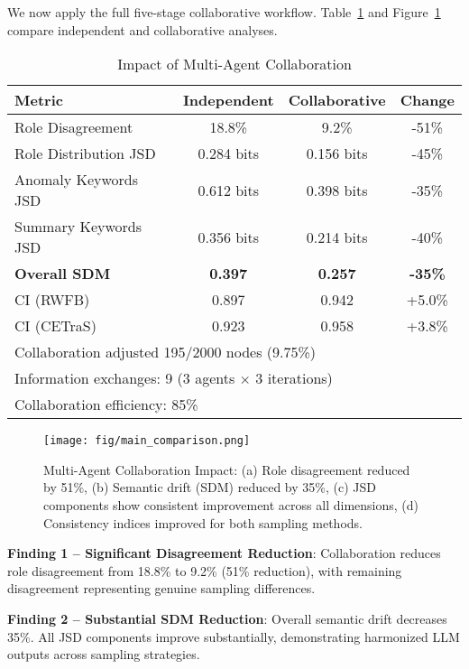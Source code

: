 \documentclass[conference]{IEEEtran}
\begin{document}
We now apply the full five-stage collaborative workflow. Table~\ref{tab:collaboration-impact} and Figure~\ref{fig:main-comparison} compare independent and collaborative analyses.

\begin{table}[htbp]
\centering
\caption{Impact of Multi-Agent Collaboration}
\label{tab:collaboration-impact}
\small
\begin{tabular}{l c c c}
\toprule
\textbf{Metric} & \textbf{Independent} & \textbf{Collaborative} & \textbf{Change} \\
\midrule
Role Disagreement & 18.8\% & 9.2\% & -51\% \\
Role Distribution JSD & 0.284 bits & 0.156 bits & -45\% \\
Anomaly Keywords JSD & 0.612 bits & 0.398 bits & -35\% \\
Summary Keywords JSD & 0.356 bits & 0.214 bits & -40\% \\
\textbf{Overall SDM} & \textbf{0.397} & \textbf{0.257} & \textbf{-35\%} \\
\midrule
CI (RWFB) & 0.897 & 0.942 & +5.0\% \\
CI (CETraS) & 0.923 & 0.958 & +3.8\% \\
\midrule
\multicolumn{4}{l}{\footnotesize Collaboration adjusted 195/2000 nodes (9.75\%)} \\
\multicolumn{4}{l}{\footnotesize Information exchanges: 9 (3 agents $\times$ 3 iterations)} \\
\multicolumn{4}{l}{\footnotesize Collaboration efficiency: 85\%} \\
\bottomrule
\end{tabular}
\end{table}

\begin{figure}[htbp]
    \centering
    \texttt{[image: fig/main\_comparison.png]}
    \caption{Multi-Agent Collaboration Impact: (a) Role disagreement reduced by 51\%, (b) Semantic drift (SDM) reduced by 35\%, (c) JSD components show consistent improvement across all dimensions, (d) Consistency indices improved for both sampling methods.}
    \label{fig:main-comparison}
\end{figure}

\textbf{Finding 1 -- Significant Disagreement Reduction}: Collaboration reduces role disagreement from 18.8\% to 9.2\% (51\% reduction), with remaining disagreement representing genuine sampling differences.

\textbf{Finding 2 -- Substantial SDM Reduction}: Overall semantic drift decreases 35\%. All JSD components improve substantially, demonstrating harmonized LLM outputs across sampling strategies.
\end{document}
